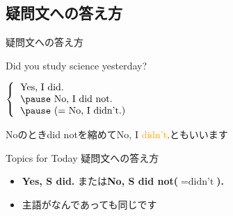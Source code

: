 \documentclass[aspectratio=169,xcolor={dvipsnames,table}]{beamer}
\newcommand{\myaudio}[1]{\href{#1}{\faVolumeUp}}
\begin{document}
\subsection{疑問文への答え方}
 \begin{frame}[plain]{疑問文への答え方}
 \Large
\pause

Did  you study science yesterday?

\vspace{20pt}
\pause

\mbox{}\hspace{100pt}$\left\{\begin{tabular}{l}
         \text{Yes, I did.}\\\pause
         \text{No, I did not.}\\\pause
         \text{(}= \text{No, I didn't.)}
        \end{tabular}\right.$

\pause

\mbox{}\hfill{}{\small Noのときdid notを縮めてNo, I \textcolor{orange}{didn't}.ともいいます}\,\,\myaudio{./audio/027_past_did_you_03.mp3}

\begin{exampleblock}{Topics for Today}
\small
疑問文への答え方
\begin{itemize}[square]
 \item  \textcolor{NavyBlue}{\bfseries Yes, S did.} または\textcolor{NavyBlue}{\bfseries No, S did not($=\text{didn't}$).}
 \item  主語がなんであっても同じです
\end{itemize}
      \end{exampleblock}

\end{frame}
\end{document}
